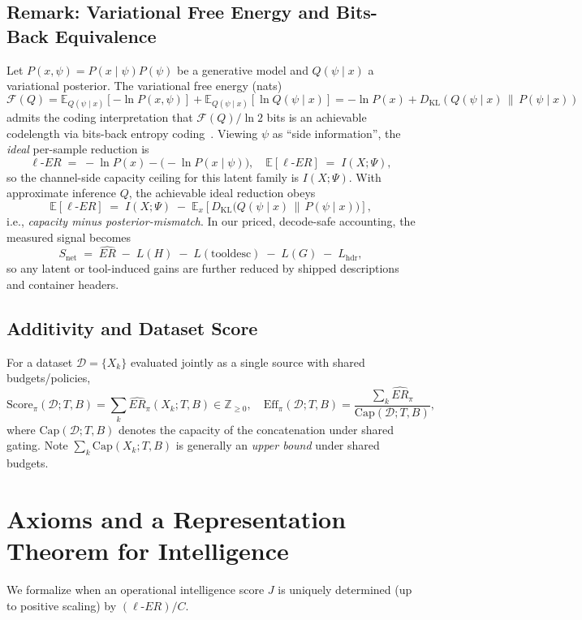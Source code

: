 \documentclass[12pt,a4paper]{article}
\newcommand{\ERideal}{\ell\text{-}ER}
\begin{document}
\subsection*{Remark: Variational Free Energy and Bits-Back Equivalence}
Let $P(x,\psi)=P(x\mid\psi)P(\psi)$ be a generative model and $Q(\psi\mid x)$ a variational posterior. The variational free energy (nats)
\[
\mathcal F(Q)
=\mathbb E_{Q(\psi\mid x)}[-\ln P(x,\psi)]
+\mathbb E_{Q(\psi\mid x)}[\ln Q(\psi\mid x)]
= -\ln P(x) + D_{\mathrm{KL}}(Q(\psi\mid x)\,\|\,P(\psi\mid x))
\]
admits the coding interpretation that $\mathcal F(Q)/\ln 2$ bits is an achievable codelength via bits-back entropy coding~\citep{townsend2019bbans}. 
Viewing $\psi$ as ``side information'', the \emph{ideal} per-sample reduction is
\[
\ERideal \;=\; -\ln P(x) - \big(-\ln P(x\mid\psi)\big),
\quad
\mathbb E[\ERideal] \;=\; I(X;\Psi),
\]
so the channel-side capacity ceiling for this latent family is $I(X;\Psi)$. 
With approximate inference $Q$, the achievable ideal reduction obeys
\[
\mathbb E[\ERideal]
\;=\;
I(X;\Psi)
\;-\;
\mathbb E_{x}\!\left[D_{\mathrm{KL}}\!\big(Q(\psi\mid x)\,\|\,P(\psi\mid x)\big)\right],
\]
i.e., \emph{capacity minus posterior-mismatch}. 
In our priced, decode-safe accounting, the measured signal becomes
\[
S_{\text{net}}
\;=\;
\widehat{ER}
\;-\;
L(H)
\;-\;
L(\text{tooldesc})
\;-\;
L(G)
\;-\;
L_{\mathrm{hdr}},
\]
so any latent or tool-induced gains are further reduced by shipped descriptions and container headers.

\subsection{Additivity and Dataset Score}
For a dataset $\mathcal{D}=\{X_k\}$ evaluated jointly as a single source with shared budgets/policies,
\begin{equation}
\mathrm{Score}_\pi(\mathcal{D};T,B) = \sum_k \widehat{ER}_\pi(X_k;T,B)\in \mathbb{Z}_{\ge 0},
\quad
\mathrm{Eff}_\pi(\mathcal{D};T,B)=\frac{\sum_k \widehat{ER}_\pi}{\mathrm{Cap}(\mathcal{D};T,B)},
\end{equation}
where $\mathrm{Cap}(\mathcal{D};T,B)$ denotes the capacity of the concatenation under shared gating. Note $\sum_k \mathrm{Cap}(X_k;T,B)$ is generally an \emph{upper bound} under shared budgets.

\section{Axioms and a Representation Theorem for Intelligence}
\label{sec:axioms}
We formalize when an operational intelligence score $J$ is uniquely determined (up to positive scaling) by $(\ERideal)/C$.
\end{document}
